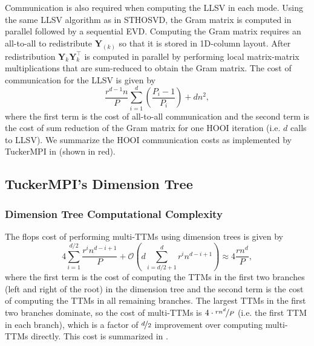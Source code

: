         Communication is also required when computing the LLSV in each mode.
        Using the same LLSV algorithm as in STHOSVD, the Gram matrix is computed
        in parallel followed by a sequential EVD. Computing the Gram matrix
        requires an all-to-all to redistribute $\mathbf{Y}_{(k)}$ so that it is
        stored in 1D-column layout. After redistribution
        $\mathbf{Y}_{k}\mathbf{Y}_{k}^\intercal$ is computed in parallel by
        performing local matrix-matrix multiplications that are sum-reduced to
        obtain the Gram matrix. The cost of communication for the LLSV is given
        by
        \begin{equation*}
            \frac{r^{d-1}n}{P} \sum_{i = 1}^{d}\left(\frac{P_i-1}{P_i}\right) + dn^2,
        \end{equation*}
        where the first term is the cost of all-to-all communication and the second term
        is the cost of sum reduction of the Gram matrix for one HOOI iteration (i.e. $d$
        calls to LLSV).
        We summarize the HOOI communication costs as implemented by TuckerMPI in  (shown in red).


\subsection{TuckerMPI's Dimension Tree} \label{sec:TuckerMPI's Dimension Tree}
    \subsubsection{Dimension Tree Computational Complexity} \label{sec:Dimension Tree Computational Complexity}

        The flops cost of performing multi-TTMs using dimension trees is given by
        \begin{equation*}
            4 \sum_{i=1}^{d/2} \frac{r^i n^{d-i+1}}{P} + \mathcal{O} \left(d \sum_{i = d/2 + 1}^{d} r^i n^{d - i + 1}\right) \approx 4\frac{rn^d}{P},
        \end{equation*}
        where the first term is the cost of computing the TTMs in the first two branches
        (left and right of the root) in the dimension tree and the second term is the
        cost of computing the TTMs in all remaining branches. The largest TTMs in the
        first two branches dominate, so the cost of multi-TTMs is $4\cdot \nicefrac{rn^d}{P}$
        (i.e. the first TTM in each branch), which is a factor of $\nicefrac d2$ improvement over
        computing multi-TTMs directly. This cost is summarized in .
    
